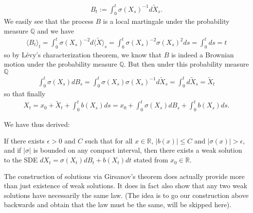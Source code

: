 \documentclass[../mainfile.tex]{subfiles}
\begin{document}
\begin{itemize}
\begin{align*}
B_t:= \int_0^t \sigma(X_s)^{-1} d \tilde{X}_s.
\end{align*}
We easily see that the process $B$ is a local martingale under the probability measure $\mathbb{Q}$ and we have
\begin{align*}
\langle B_t \rangle_t = \int_0^t \sigma(X_s)^{-2} d \langle \tilde{X} \rangle_s = \int_0^t \sigma(X_s)^{-2} \sigma(X_s)^2 ds = \int_0^t ds = t
\end{align*}
so by Lévy's characterization theorem, we know that $B$ is indeed a Brownian motion under the probability measure $\mathbb{Q}$. But then under this probability measure $\mathbb{Q}$ 
\begin{align*}
\int_0^t \sigma (X_s) d B_s = \int_0^t \sigma(X_s) \sigma(X_s)^{-1} d \tilde{X}_s = \int_0^t d \tilde{X}_s = \tilde{X}_t
\end{align*}
so that finally
\begin{align*}
X_t=x_0+ \tilde{X}_t + \int_0^t b(X_s)ds = x_0 + \int_0^t \sigma(X_s)dB_s + \int_0^t b(X_s)ds. 
\end{align*}
\end{itemize}
We have thus derived:
\begin{prop} If there exists $\epsilon >0$ and $C$ such that for all $x \in \mathbb{R}$, $|b(x)| \leq C$ and $|\sigma(x)| > \epsilon$, and if $|\sigma|$ is bounded on any compact interval, then there exists a weak solution to the SDE $dX_t= \sigma(X_t)dB_t + b(X_t)dt$ stated from $x_0 \in \mathbb{R}$. 
\end{prop}
\begin{rem}The construction of solutions via Girsanov's theorem does actually provide more
than just existence of weak solutions. It does in fact also show that any two weak solutions have
necessarily the same law. (The idea is to go our construction above backwards and obtain that the law must be the same, will be skipped here). 
\end{rem}
\end{document}
